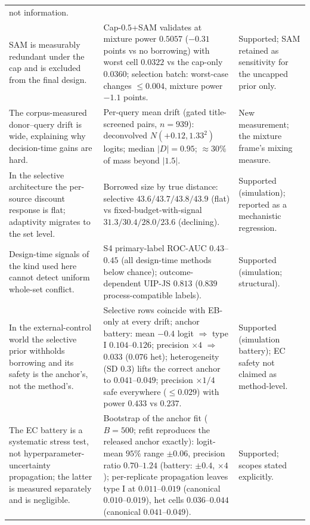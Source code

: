 \documentclass[11pt]{article}
\begin{document}
\begin{longtable}{p{} p{} p{}}
not information. \\
SAM is measurably redundant under the cap and is excluded from the final
design. & Cap-$0.5$+SAM validates at mixture power $0.5057$ ($-0.31$
points vs no borrowing) with worst cell $0.0322$ vs the cap-only
$0.0360$; selection batch: worst-case changes $\le 0.004$, mixture power
$-1.1$ points. & Supported; SAM retained as sensitivity for the uncapped
prior only. \\
The corpus-measured donor--query drift is wide, explaining why
decision-time gains are hard. & Per-query mean drift (gated
title-screened pairs, $n=939$): deconvolved $N(+0.12, 1.33^2)$ logits;
median $|D| = 0.95$; $\approx 30\%$ of mass beyond $|1.5|$. & New
measurement; the mixture frame's mixing measure. \\
In the selective architecture the per-source discount response is flat;
adaptivity migrates to the set level. & Borrowed size by true distance:
selective $43.6/43.7/43.8/43.9$ (flat) vs fixed-budget-with-signal
$31.3/30.4/28.0/23.6$ (declining). & Supported (simulation); reported as a
mechanistic regression. \\
Design-time signals of the kind used here cannot detect uniform whole-set
conflict. & S4 primary-label ROC-AUC $0.43$--$0.45$ (all design-time methods
below chance); outcome-dependent UIP-JS $0.813$ ($0.839$ process-compatible
labels). & Supported (simulation; structural). \\
In the external-control world the selective prior withholds borrowing and
its safety is the anchor's, not the method's. & Selective rows coincide with
EB-only at every drift; anchor battery: mean $-0.4$ logit $\Rightarrow$
type I $0.104$--$0.126$; precision $\times4$ $\Rightarrow$ $0.033$
($0.076$ het); heterogeneity (SD $0.3$) lifts the correct anchor to
$0.041$--$0.049$; precision $\times1/4$ safe everywhere ($\le0.029$) with
power $0.433$ vs $0.237$. & Supported (simulation battery); EC safety not
claimed as method-level. \\
The EC battery is a systematic stress test, not hyperparameter-uncertainty
propagation; the latter is measured separately and is negligible. &
Bootstrap of the anchor fit ($B=500$; refit reproduces the released anchor
exactly): logit-mean $95\%$ range $\pm 0.06$, precision ratio
$0.70$--$1.24$ (battery: $\pm 0.4$, $\times 4$); per-replicate propagation
leaves type I at $0.011$--$0.019$ (canonical $0.010$--$0.019$), het cells
$0.036$--$0.044$ (canonical $0.041$--$0.049$). & Supported; scopes stated
explicitly. \\

\end{longtable}
\end{document}
